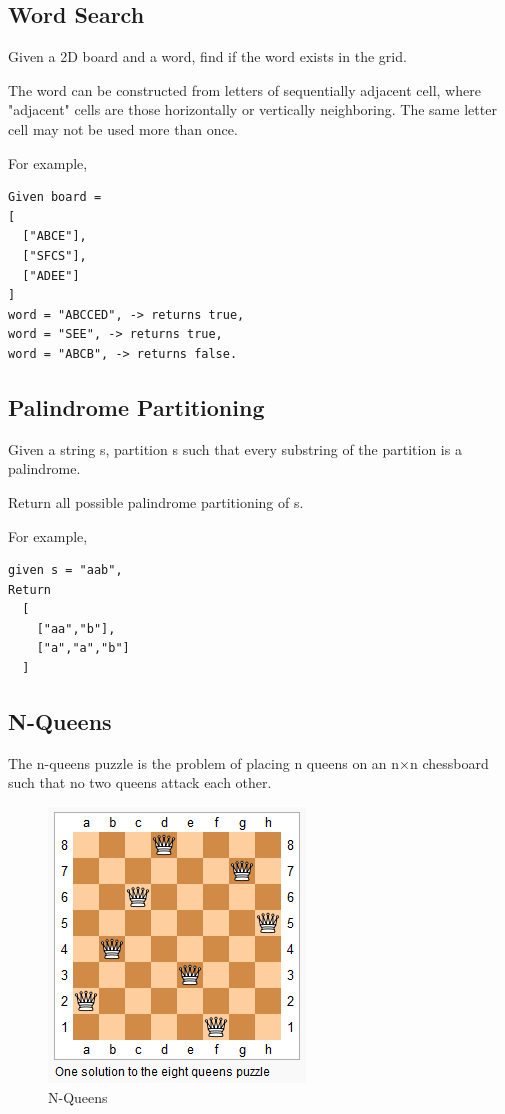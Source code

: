\documentclass[12pt]{book}
\begin{document}
\subsection{Word Search}
\label{sec-16-4-5}
Given a 2D board and a word, find if the word exists in the grid.

The word can be constructed from letters of sequentially adjacent cell, where "adjacent" cells are those horizontally or vertically neighboring. The same letter cell may not be used more than once.

For example,
\lstset{language=java,label= ,caption= ,numbers=none}
\begin{lstlisting}
Given board =
[
  ["ABCE"],
  ["SFCS"],
  ["ADEE"]
]
word = "ABCCED", -> returns true,
word = "SEE", -> returns true,
word = "ABCB", -> returns false.
\end{lstlisting}
\subsection{Palindrome Partitioning}
\label{sec-16-4-6}
Given a string s, partition s such that every substring of the partition is a palindrome.

Return all possible palindrome partitioning of s.

For example, 
\lstset{language=java,label= ,caption= ,numbers=none}
\begin{lstlisting}
given s = "aab",
Return
  [
    ["aa","b"],
    ["a","a","b"]
  ]
\end{lstlisting}
\subsection{N-Queens}
\label{sec-16-4-7}
The n-queens puzzle is the problem of placing n queens on an n×n chessboard such that no two queens attack each other.
\begin{figure}[htb]
\centering
\includegraphics[width=.9\linewidth]{./pic/8-queens.png}
\caption{N-Queens}
\end{figure}
\end{document}
